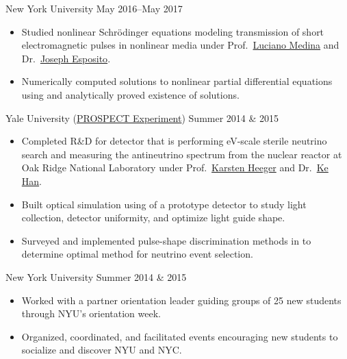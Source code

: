 \documentclass{cultvoucher}
\begin{document}
         {New York University}
         {May 2016--May 2017}
\begin{itemize}
    \vspace{-0.25em}
    \item Studied nonlinear Schr\"{o}dinger equations modeling transmission of
          short electromagnetic pulses in nonlinear media under Prof.\
          \href{https://www.sites.google.com/a/nyu.edu/luciano-medina/}{Luciano Medina}
          and Dr.\ \href{https://cims.nyu.edu/~esposito/}{Joseph Esposito}.
    \item Numerically computed solutions to nonlinear partial differential
          equations using \keyword{python} and analytically proved existence of
          solutions.
\end{itemize}

         {Yale University (\href{http://prospect.yale.edu/}{\small{PROSPECT Experiment}})}
         {Summer 2014 \& 2015}
\begin{itemize}
    \vspace{-0.25em}
    \item Completed R\&D for detector that is performing eV-scale sterile
          neutrino search and measuring the antineutrino spectrum from the
          nuclear reactor at Oak Ridge National Laboratory under Prof.\
          \href{http://heegerlab.yale.edu/karsten-heeger}{Karsten Heeger} and
          Dr.\ \href{https://www.physics.sjtu.edu.cn/en/people/1/kehan}{Ke Han}.
    \item Built optical simulation using \keyword{C++} of a prototype detector
          to study light collection, detector uniformity, and optimize light
          guide shape.
    \item Surveyed and implemented pulse-shape discrimination methods in
           to determine optimal method for neutrino event
          selection.
\end{itemize}

         {New York University}
         {Summer 2014 \& 2015}
\begin{itemize}
    \vspace{-0.25em}
    \item Worked with a partner orientation leader guiding groups of 25 new
          students through NYU's orientation week.
    \item Organized, coordinated, and facilitated events encouraging new
          students to socialize and discover NYU and NYC.
\end{itemize}
\end{document}
